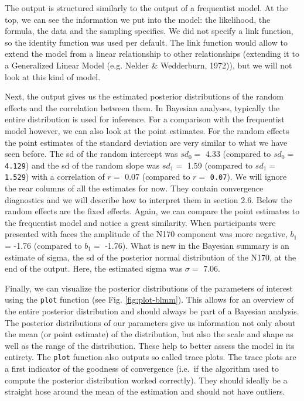 \documentclass[
  doc,12pt,floatsintext]{apa7}
\begin{document}
\normalsize

The output is structured similarly to the output of a frequentist model. At the top, we can see the information we put into the model: the likelihood, the formula, the data and the sampling specifics. We did not specify a link function, so the identity function was used per default. The link function would allow to extend the model from a linear relationship to other relationships (extending it to a Generalized Linear Model (e.g. Nelder \& Wedderburn, 1972)), but we will not look at this kind of model.

Next, the output gives us the estimated posterior distributions of the random effects and the correlation between them. In Bayesian analyses, typically the entire distribution is used for inference. For a comparison with the frequentist model however, we can also look at the point estimates. For the random effects the point estimates of the standard deviation are very similar to what we have seen before. The sd of the random intercept was \(sd_0 =\) 4.33 (compared to \(sd_0 =\) \texttt{4.129}) and the sd of the random slope was \(sd_1 =\) 1.59 (compared to \(sd_1 =\) \texttt{1.529}) with a correlation of \(r =\) 0.07 (compared to \(r =\) \texttt{0.07}). We will ignore the rear columns of all the estimates for now. They contain convergence diagnostics and we will describe how to interpret them in section 2.6. Below the random effects are the fixed effects. Again, we can compare the point estimates to the frequentist model and notice a great similarity. When participants were presented with faces the amplitude of the N170 component was more negative, \(b_1\) = -1.76 (compared to \(b_1 =\) -1.76). What is new in the Bayesian summary is an estimate of sigma, the sd of the posterior normal distribution of the N170, at the end of the output. Here, the estimated sigma was \(\sigma =\) 7.06.

Finally, we can visualize the posterior distributions of the parameters of interest using the \texttt{plot} function (see Fig. \ref{fig:plot-blmm}). This allows for an overview of the entire posterior distribution and should always be part of a Bayesian analysis. The posterior distributions of our parameters give us information not only about the mean (or point estimate) of the distribution, but also the scale and shape as well as the range of the distribution. These help to better assess the model in its entirety. The \texttt{plot} function also outputs so called trace plots. The trace plots are a first indicator of the goodness of convergence (i.e.~if the algorithm used to compute the posterior distribution worked correctly). They should ideally be a straight hose around the mean of the estimation and should not have outliers.
\end{document}
